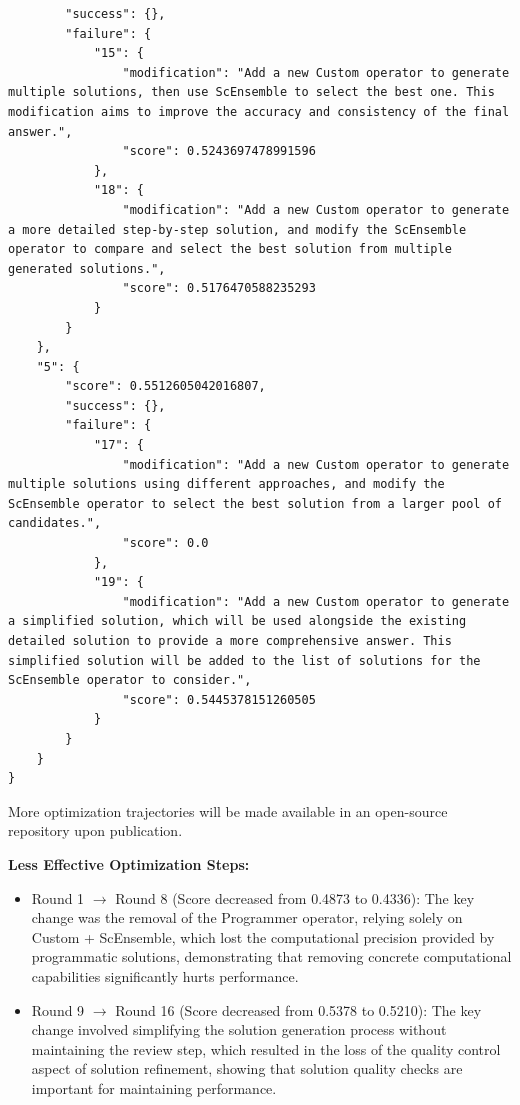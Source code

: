 \begin{tcolorbox}
\begin{verbatim}
        "success": {},
        "failure": {
            "15": {
                "modification": "Add a new Custom operator to generate multiple solutions, then use ScEnsemble to select the best one. This modification aims to improve the accuracy and consistency of the final answer.",
                "score": 0.5243697478991596
            },
            "18": {
                "modification": "Add a new Custom operator to generate a more detailed step-by-step solution, and modify the ScEnsemble operator to compare and select the best solution from multiple generated solutions.",
                "score": 0.5176470588235293
            }
        }
    },
    "5": {
        "score": 0.5512605042016807,
        "success": {},
        "failure": {
            "17": {
                "modification": "Add a new Custom operator to generate multiple solutions using different approaches, and modify the ScEnsemble operator to select the best solution from a larger pool of candidates.",
                "score": 0.0
            },
            "19": {
                "modification": "Add a new Custom operator to generate a simplified solution, which will be used alongside the existing detailed solution to provide a more comprehensive answer. This simplified solution will be added to the list of solutions for the ScEnsemble operator to consider.",
                "score": 0.5445378151260505
            }
        }
    }
}
\end{verbatim}
\end{tcolorbox}
More optimization trajectories will be made available in an open-source repository upon publication.

\textbf{Less Effective Optimization Steps:}
\begin{itemize}[leftmargin=20pt]
    \item Round 1 $\rightarrow$ Round 8 (Score decreased from 0.4873 to 0.4336): The key change was the removal of the Programmer operator, relying solely on Custom + ScEnsemble, which lost the computational precision provided by programmatic solutions, demonstrating that removing concrete computational capabilities significantly hurts performance.
    
    \item Round 9 $\rightarrow$ Round 16 (Score decreased from 0.5378 to 0.5210): The key change involved simplifying the solution generation process without maintaining the review step, which resulted in the loss of the quality control aspect of solution refinement, showing that solution quality checks are important for maintaining performance.
\end{itemize}

